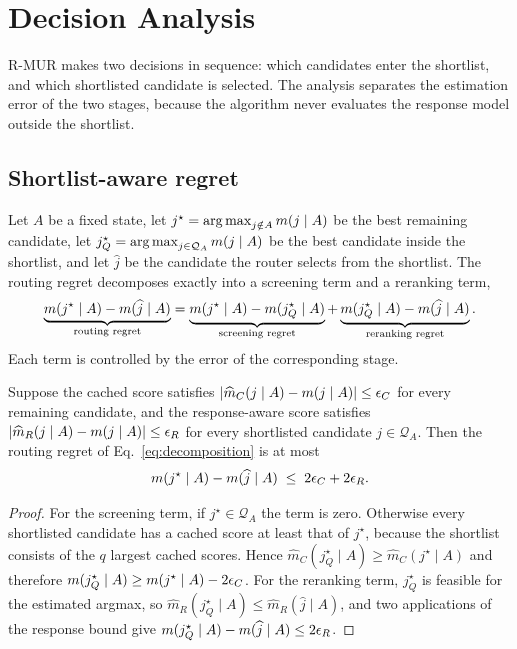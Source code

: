 \section{Decision Analysis}
\label{sec:analysis}

R-MUR makes two decisions in sequence: which candidates enter the shortlist,
and which shortlisted candidate is selected. The analysis separates the
estimation error of the two stages, because the algorithm never evaluates the
response model outside the shortlist.

\subsection{Shortlist-aware regret}

Let $A$ be a fixed state, let
$j^\star=\operatorname*{arg\,max}_{j\notin A}m(j\mid A)$ be the best remaining
candidate, let
$j^\star_Q=\operatorname*{arg\,max}_{j\in\mathcal Q_A}m(j\mid A)$ be the best candidate
inside the shortlist, and let $\widehat{j}$ be the candidate the router selects
from the shortlist. The routing regret decomposes exactly into a screening term
and a reranking term,
\begin{equation}
 \underbrace{m(j^\star\mid A)-m(\widehat{j}\mid A)}_{\text{routing regret}}
 =
 \underbrace{m(j^\star\mid A)-m(j^\star_Q\mid A)}_{\text{screening regret}}
 +
 \underbrace{m(j^\star_Q\mid A)-m(\widehat{j}\mid A)}_{\text{reranking regret}} .
 \label{eq:decomposition}
\end{equation}
Each term is controlled by the error of the corresponding stage.

\begin{proposition}
\label{prop:shortlist}
Suppose the cached score satisfies
$|\widehat m_C(j\mid A)-m(j\mid A)|\le\epsilon_C$ for every remaining
candidate, and the response-aware score satisfies
$|\widehat m_R(j\mid A)-m(j\mid A)|\le\epsilon_R$ for every
shortlisted candidate $j\in\mathcal Q_A$. Then the routing regret of
Eq.~\eqref{eq:decomposition} is at most
\begin{equation}
 m(j^\star\mid A)-m(\widehat{j}\mid A)\;\le\;2\epsilon_C+2\epsilon_R .
 \label{eq:shortlistbound}
\end{equation}
\end{proposition}

\begin{proof}
For the screening term, if $j^\star\in\mathcal Q_A$ the term is zero. Otherwise
every shortlisted candidate has a cached score at least that of $j^\star$,
because the shortlist consists of the $q$ largest cached scores. Hence
$\widehat m_C(j^\star_Q\mid A)\ge\widehat m_C(j^\star\mid A)$ and therefore
$m(j^\star_Q\mid A)\ge m(j^\star\mid A)-2\epsilon_C$. For the
reranking term, $j^\star_Q$ is feasible for the estimated argmax, so
$\widehat m_R(j^\star_Q\mid A)\le\widehat m_R(\widehat{j}\mid A)$, and two
applications of the response bound give
$m(j^\star_Q\mid A)-m(\widehat{j}\mid A)\le 2\epsilon_R$.
\end{proof}

